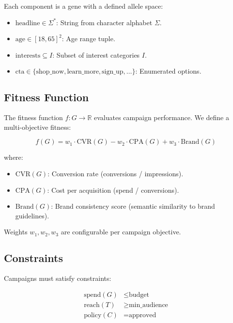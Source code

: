 \documentclass[11pt,twocolumn]{article}
\begin{document}
Each component is a gene with a defined allele space:

\begin{itemize}
\item $\text{headline} \in \Sigma^*$: String from character alphabet $\Sigma$.
\item $\text{age} \in [18, 65]^2$: Age range tuple.
\item $\text{interests} \subseteq I$: Subset of interest categories $I$.
\item $\text{cta} \in \{\text{shop\_now}, \text{learn\_more}, \text{sign\_up}, \ldots\}$: Enumerated options.
\end{itemize}

\subsection{Fitness Function}

The fitness function $f: G \rightarrow \mathbb{R}$ evaluates campaign performance. We define a multi-objective fitness:

\begin{equation}
f(G) = w_1 \cdot \text{CVR}(G) - w_2 \cdot \text{CPA}(G) + w_3 \cdot \text{Brand}(G)
\end{equation}

where:
\begin{itemize}
\item $\text{CVR}(G)$: Conversion rate (conversions / impressions).
\item $\text{CPA}(G)$: Cost per acquisition (spend / conversions).
\item $\text{Brand}(G)$: Brand consistency score (semantic similarity to brand guidelines).
\end{itemize}

Weights $w_1, w_2, w_3$ are configurable per campaign objective.

\subsection{Constraints}

Campaigns must satisfy constraints:

\begin{align}
\text{spend}(G) &\leq \text{budget} \\
\text{reach}(T) &\geq \text{min\_audience} \\
\text{policy}(C) &= \text{approved}
\end{align}
\end{document}
